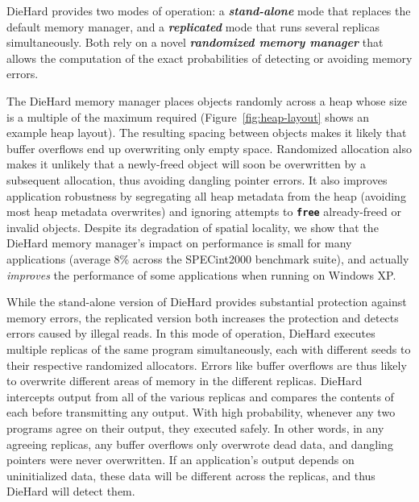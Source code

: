 \documentclass{sig-alternate}
\newcommand{\cfunction}[1]{{\bf \tt #1}}
\newcommand{\free}{\cfunction{free}}
\begin{document}
\noindent
DieHard provides two modes of operation: a \emph{\bf stand-alone} mode
that replaces the default memory manager, and a \emph{\bf replicated} mode
that runs several replicas simultaneously. Both rely on a novel
\emph{\bf randomized memory manager} that allows the computation of the exact probabilities of detecting or avoiding memory errors.


The DieHard memory manager places objects randomly across a heap whose
size is a multiple of the maximum required
(Figure~\ref{fig:heap-layout} shows an example heap layout). The
resulting spacing between objects makes it likely that buffer
overflows end up overwriting only empty space. Randomized allocation
also makes it unlikely that a newly-freed object will soon be
overwritten by a subsequent allocation, thus avoiding dangling pointer
errors.  It also improves application robustness by segregating all
heap metadata from the heap (avoiding most heap metadata overwrites)
and ignoring attempts to \free{} already-freed or invalid
objects. Despite its degradation of spatial locality, we show that the
DieHard memory manager's impact on performance is small for many
applications (average 8\% across the SPECint2000 benchmark suite), and
actually \emph{improves} the performance of some applications when
running on Windows XP.

While the stand-alone version of DieHard provides substantial
protection against memory errors, the replicated version both
increases the protection and detects errors caused by illegal
reads. In this mode of operation, DieHard executes multiple replicas
of the same program simultaneously, each with different seeds to their
respective randomized allocators. Errors like buffer overflows are
thus likely to overwrite different areas of memory in the different
replicas. DieHard intercepts output from all
of the various replicas and compares the contents of each before
transmitting any output. With high probability, whenever any two
programs agree on their output, they executed safely. In other words,
in any agreeing replicas, any buffer overflows only overwrote dead
data, and dangling pointers were never overwritten. If an
application's output depends on uninitialized data, these data will be
different across the replicas, and thus DieHard will detect them.

\end{document}
